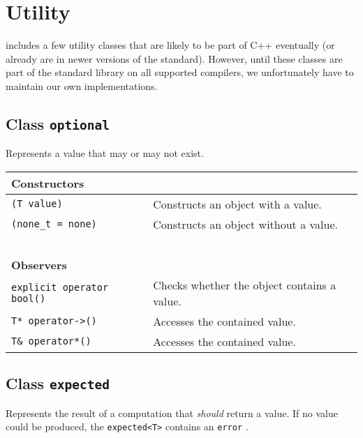 \section{Utility}
\label{utility}

\lib includes a few utility classes that are likely to be part of C++
eventually (or already are in newer versions of the standard). However, until
these classes are part of the standard library on all supported compilers, we
unfortunately have to maintain our own implementations.

\subsection{Class \lstinline^optional^}
\label{optional}

Represents a value that may or may not exist.

\begin{center}
\begin{tabular}{ll}
  \textbf{Constructors} & ~ \\
  \hline
  \lstinline^(T value)^ & Constructs an object with a value. \\
  \hline
  \lstinline^(none_t = none)^ & Constructs an object without a value. \\
  \hline
  ~ & ~ \\ \textbf{Observers} & ~ \\
  \hline
  \lstinline^explicit operator bool()^ & Checks whether the object contains a value. \\
  \hline
  \lstinline^T* operator->()^ & Accesses the contained value. \\
  \hline
  \lstinline^T& operator*()^ & Accesses the contained value. \\
  \hline
\end{tabular}
\end{center}

\subsection{Class \lstinline^expected^}

Represents the result of a computation that \emph{should} return a value. If no
value could be produced, the \lstinline^expected<T>^ contains an
\lstinline^error^ .

